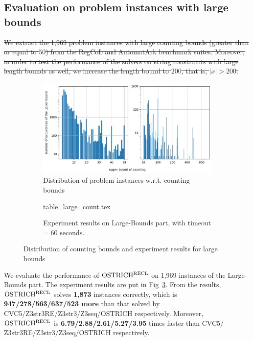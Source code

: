 \subsection{Evaluation on problem instances with large bounds}\label{subsec:large_bounds_eval}
%
\sout{We extract the 1,969 problem instances with large counting bounds (greater than or equal to $50$) from the RegCoL and AutomatArk benchmark suites.  
Moreover, in order to test the performance of the solvers on string constraints with large length bounds as well, we increase the length bound to $200$, that is, $|x| > 200$.}
%
\begin{figure}[ht]
  \centering
  \begin{subfigure}[t]{0.49\textwidth}
    \centering\vskip 0pt
    \includegraphics[width=1\textwidth]{counting_distribution.png}  
    \caption{Distribution of problem instances w.r.t. counting bounds}  
    \label{fig:count_distri}
  \end{subfigure}
  \hfill
  \begin{subfigure}[t]{0.49\textwidth}
    \centering\vskip 0pt
    {table_large_count.tex}
    \caption{Experiment results on Large-Bounds part, with timeout = 60 seconds.}
    \label{fig:table_large_count}
  \end{subfigure}
  \caption{Distribution of counting bounds and experiment results for large bounds}
\end{figure}

We evaluate the performance of $\rm OSTRICH^{RECL}$ on 1,969 instances of the Large-Bounds part. 
The experiment results are put in Fig~\ref{fig:table_large_count}. From the results, $\rm OSTRICH^{RECL}$ solves \textbf{1,873} instances correctly, which is \textbf{947/278/563/637/523 more} than that solved by CVC5/Z3str3RE/Z3str3/Z3seq/OSTRICH respectively. Moreover, $\rm OSTRICH^{RECL}$ is \textbf{ 6.79/2.88/2.61/5.27/3.95} times faster than CVC5/ Z3str3RE/Z3str3/Z3seq/OSTRICH respectively. 

